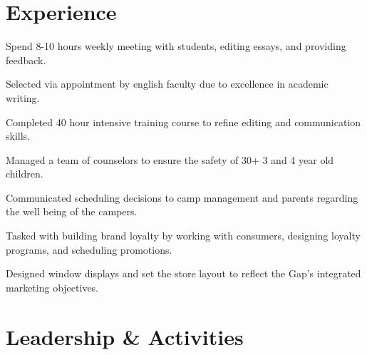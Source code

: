 \documentclass{resume}
\begin{document}
\hfill
\begin{minipage}[t]{0.66\textwidth}


\section{Experience}

\vspace{1.25\topsep} %
\begin{tightemize}
\item Spend 8-10 hours weekly meeting with students, editing essays, and providing feedback. 
\item Selected via appointment by english faculty due to excellence in academic writing.
\item Completed 40 hour intensive training course to refine editing  and communication skills.
\end{tightemize}
\sectionsep

\begin{tightemize}
\item Managed a team of counselors to ensure the safety of 30+ 3 and 4 year old children.
\item Communicated scheduling decisions to camp management and parents regarding the well being of the campers. 
\end{tightemize}
\sectionsep

\begin{tightemize}
\item Tasked with building brand loyalty by working with consumers, designing loyalty programs, and scheduling promotions.
\item Designed window displays and set the store layout to reflect the Gap's integrated marketing objectives. 
\end{tightemize}
\sectionsep

\section{Leadership \& Activities}


\end{minipage}
\end{document}
